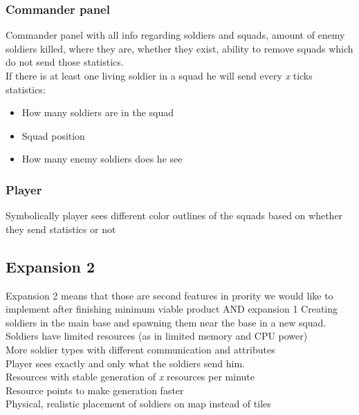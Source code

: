 \documentclass{article}
\begin{document}
\subsubsection{Commander panel}
Commander panel with all info regarding soldiers and squads, amount of enemy soldiers killed, where they are, whether they exist, ability to remove squads which do not send those statistics. \\ 
If there is at least one living soldier in a squad he will send every \textit{x} ticks statistics: 
\begin{itemize}
\item How many soldiers are in the squad 
\item Squad position
\item How many enemy soldiers does he see
\end{itemize} 

\subsubsection{Player}
Symbolically player sees different color outlines of the squads based on whether they send statistics or not

\subsection{Expansion 2}
Expansion 2 means that those are second features in prority we would like to
implement after finishing minimum viable product AND expansion 1
Creating soldiers in the main base and spawning them near the base in a new squad. \\ 
Soldiers have limited resources (as in limited memory and CPU power) \\ 
More soldier types with different communication and attributes \\ 
Player sees exactly and only what the soldiers send him. \\
Resources with stable generation of \textit{x} resources per minute \\ 
Resource points to make generation faster \\
Physical, realistic placement of soldiers on map instead of tiles \\ 
\end{document}
